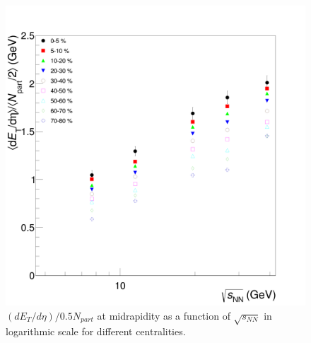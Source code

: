 	\begin{figure}[h]
	  \centering
	  \includegraphics[width=5.5in]{figures/finalStacked/dETdEtaOverNpartBy2SumCent8s.png}
	  \caption{$(dE_{T}/d\eta)/0.5N_{part}$ at midrapidity as a function of $\sqrt{s_{NN}}$ in logarithmic scale for different centralities.}\label{fig:dETdEtaOverNpartBy2SumCents}
	\end{figure}
	
